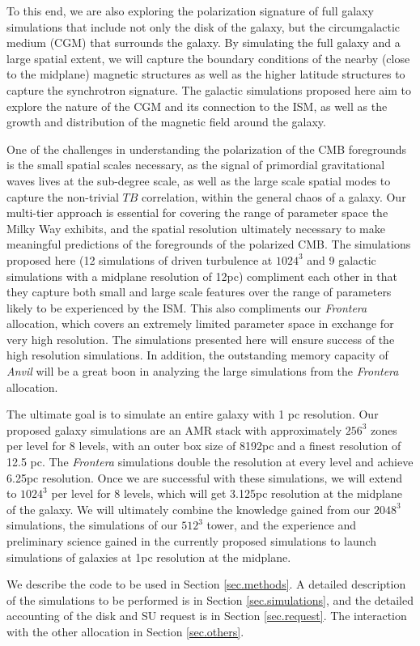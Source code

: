To this end, we are also exploring the polarization signature of full galaxy
simulations that include not only the disk of the galaxy, but the circumgalactic medium
(CGM) that surrounds the galaxy.  By simulating the full galaxy and a large
spatial extent, we will capture the boundary conditions of the nearby (close to
the midplane) magnetic structures as well as the higher latitude structures to
capture the synchrotron signature.  The galactic simulations proposed here aim
to explore the nature of the CGM and its connection to the ISM, as well as the
growth and distribution of the magnetic field around the galaxy.

One of the challenges in understanding the polarization of the CMB foregrounds
is the small spatial scales necessary, as the signal of primordial gravitational
waves lives at the sub-degree scale, as well as the large
scale spatial modes to capture the non-trivial $TB$ correlation, within the general
chaos of a galaxy.  Our multi-tier
approach is essential for covering the range of parameter space the Milky Way
exhibits, and the spatial resolution ultimately necessary to make meaningful
predictions of the foregrounds of the polarized CMB.  The simulations proposed
here (12 simulations of driven turbulence at $1024^3$ and 9 galactic simulations
with a midplane resolution of 12pc) compliment each other in that they capture
both small and large scale features over the range of parameters likely to be
experienced by the ISM.  This also compliments our \emph{Frontera} allocation,
which covers an extremely limited parameter space in exchange for very high
resolution.  The simulations presented here will ensure success of the high
resolution simulations.  In addition, the outstanding memory capacity of
\emph{Anvil} will be a great boon in analyzing the large simulations from the
\emph{Frontera} allocation.  

The ultimate goal is to simulate an entire galaxy with 1 pc resolution.  Our
proposed galaxy simulations are an AMR stack with approximately $256^3$ zones
per level for 8 levels, with an outer box size of 8192pc and a finest resolution
of 12.5 pc.  The \emph{Frontera} simulations double the resolution at every
level and achieve 6.25pc resolution.  Once we are successful with these
simulations, we will extend to $1024^3$ per level for 8 levels, which will get
3.125pc resolution at the midplane of the galaxy.  We will ultimately
combine the knowledge gained from our $2048^3$ simulations,  the simulations of our $512^3$
tower, and the experience and preliminary science gained in the currently
proposed simulations to launch simulations of galaxies at 1pc resolution at the
midplane.

We describe the code to be used in Section \ref{sec.methods}. A detailed
description of the  simulations  to be performed is in Section
\ref{sec.simulations}, and the detailed accounting of the disk and SU request is
in Section \ref{sec.request}. The interaction with the other allocation in
Section \ref{sec.others}.


